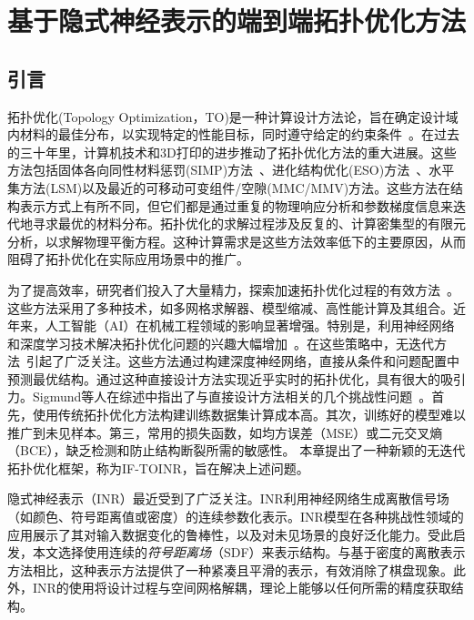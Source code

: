 
\chapter{基于隐式神经表示的端到端拓扑优化方法}

\section{引言}
拓扑优化(Topology Optimization，TO)是一种计算设计方法论，旨在确定设计域内材料的最佳分布，以实现特定的性能目标，同时遵守给定的约束条件~\cite{sigmund2013}。在过去的三十年里，计算机技术和3D打印的进步推动了拓扑优化方法的重大进展。这些方法包括固体各向同性材料惩罚(SIMP)方法~\cite{bendsoe1999}、进化结构优化(ESO)方法~\cite{xie1993}、水平集方法(LSM)\cite{wang2003level}以及最近的可移动可变组件/空隙(MMC/MMV)方法\cite{guo2014doing,zhang2017explicit}。这些方法在结构表示方式上有所不同，但它们都是通过重复的物理响应分析和参数梯度信息来迭代地寻求最优的材料分布。拓扑优化的求解过程涉及反复的、计算密集型的有限元分析，以求解物理平衡方程。这种计算需求是这些方法效率低下的主要原因，从而阻碍了拓扑优化在实际应用场景中的推广。

为了提高效率，研究者们投入了大量精力，探索加速拓扑优化过程的有效方法~\cite{mukherjee2021}。这些方法采用了多种技术，如多网格求解器、模型缩减、高性能计算及其组合。近年来，人工智能（AI）在机械工程领域的影响显著增强。特别是，利用神经网络和深度学习技术解决拓扑优化问题的兴趣大幅增加~\cite{cang2019one,kollmann2020deep,nie2020optimization,chandrasekhar2021,hoang2022,woldseth2022}。在这些策略中，无迭代方法~\cite{li_cad_2019,behzadi_2021}引起了广泛关注。这些方法通过构建深度神经网络，直接从条件和问题配置中预测最优结构。通过这种直接设计方法实现近乎实时的拓扑优化，具有很大的吸引力。Sigmund等人在综述中指出了与直接设计方法相关的几个挑战性问题~\cite{woldseth2022}。首先，使用传统拓扑优化方法构建训练数据集计算成本高。其次，训练好的模型难以推广到未见样本。第三，常用的损失函数，如均方误差（MSE）或二元交叉熵（BCE），缺乏检测和防止结构断裂所需的敏感性。
本章提出了一种新颖的无迭代拓扑优化框架，称为IF-TOINR，旨在解决上述问题。

隐式神经表示（INR）最近受到了广泛关注\cite{deepsdf,nerf2020,xie2022,xu2023deformable}。INR利用神经网络生成离散信号场（如颜色、符号距离值或密度）的连续参数化表示。INR模型在各种挑战性领域的应用展示了其对输入数据变化的鲁棒性，以及对未见场景的良好泛化能力。受此启发，本文选择使用连续的\textit{符号距离场}（SDF）来表示结构。与基于密度的离散表示方法相比，这种表示方法提供了一种紧凑且平滑的表示，有效消除了棋盘现象。此外，INR的使用将设计过程与空间网格解耦，理论上能够以任何所需的精度获取结构。

